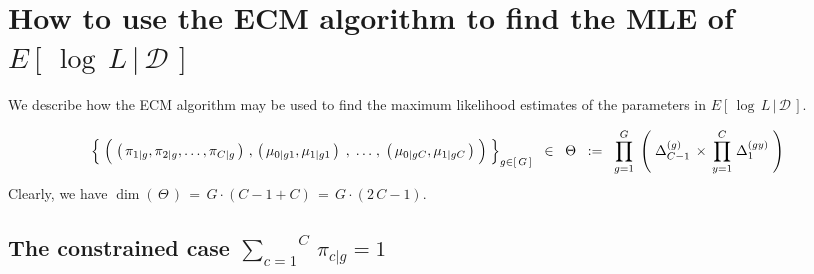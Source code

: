 

\section{How to use the ECM algorithm to find the MLE of $E\!\left[\,\left.\log\,L\,\right\vert\,\mathcal{D}\,\right]$}
\setcounter{theorem}{0}
\setcounter{equation}{0}

\renewcommand{\theenumi}{\roman{enumi}}
\renewcommand{\labelenumi}{\textnormal{(\theenumi)}$\;\;$}


We describe how the ECM algorithm \cite{Meng1993} may be used to find the
maximum likelihood estimates of the parameters in
$E\!\left[\,\left.\log\,L\,\right\vert\,\mathcal{D}\,\right]$.

\begin{equation*}
\left\{\;
	\left(\;
		\left(\,\pi_{1\vert g},\pi_{2\vert g},\ldots,\pi_{C\vert g}\,\right)
		\,,\,
		\left(\,\mu_{0 \vert g1},\mu_{1 \vert g1}\,\right)
		\;,\;
		\overset{{\color{white}\vert}}{\ldots}
		\;,\;
		\left(\,\mu_{0 \vert gC},\mu_{1 \vert gC}\,\right)
	\;\right)
\;\right\}_{g \in \left[\,G\,\right]}
\;\; \in \;\;
\Theta
\;\; := \;\;
\overset{G}{\underset{g = 1}{\prod}}\;
\left(\;
	\Delta_{C-1}^{(g)} \,\times\, \overset{C}{\underset{y = 1}{\prod}}\;\Delta_{1}^{(gy)}
\;\right)
\end{equation*}
Clearly, we have
$\dim\!\left(\,\Theta\,\right) \,=\, G\cdot(C - 1 + C) \,=\, G\cdot(2\,C-1)$.

\subsection{The constrained case $\overset{C}{\underset{c=1}{\sum}}\,\pi_{c \vert g} = 1$}


